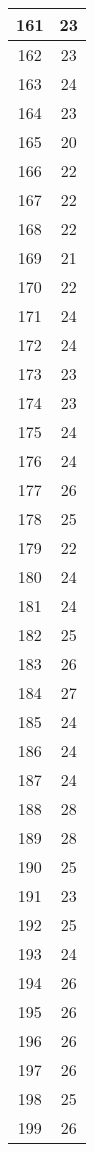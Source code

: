 \documentclass[letterpaper, 12pt]{article}
\begin{document}
\begin{longtable}{|c|c|}
161 & 23 \\
\hline
162 & 23 \\
\hline
163 & 24 \\
\hline
164 & 23 \\
\hline
165 & 20 \\
\hline
166 & 22 \\
\hline
167 & 22 \\
\hline
168 & 22 \\
\hline
169 & 21 \\
\hline
170 & 22 \\
\hline
171 & 24 \\
\hline
172 & 24 \\
\hline
173 & 23 \\
\hline
174 & 23 \\
\hline
175 & 24 \\
\hline
176 & 24 \\
\hline
177 & 26 \\
\hline
178 & 25 \\
\hline
179 & 22 \\
\hline
180 & 24 \\
\hline
181 & 24 \\
\hline
182 & 25 \\
\hline
183 & 26 \\
\hline
184 & 27 \\
\hline
185 & 24 \\
\hline
186 & 24 \\
\hline
187 & 24 \\
\hline
188 & 28 \\
\hline
189 & 28 \\
\hline
190 & 25 \\
\hline
191 & 23 \\
\hline
192 & 25 \\
\hline
193 & 24 \\
\hline
194 & 26 \\
\hline
195 & 26 \\
\hline
196 & 26 \\
\hline
197 & 26 \\
\hline
198 & 25 \\
\hline
199 & 26 \\
\hline
\end{longtable}
\end{document}

